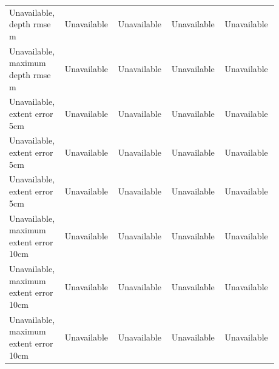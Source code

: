 \begin{longtable}{p{0.1760\linewidth}p{0.1760\linewidth}p{0.1760\linewidth}p{0.1760\linewidth}p{0.1760\linewidth}}
Unavailable, depth rmse m & Unavailable & Unavailable & Unavailable & Unavailable \\
Unavailable, maximum depth rmse m & Unavailable & Unavailable & Unavailable & Unavailable \\
Unavailable, extent error 5cm & Unavailable & Unavailable & Unavailable & Unavailable \\
Unavailable, extent error 5cm & Unavailable & Unavailable & Unavailable & Unavailable \\
Unavailable, extent error 5cm & Unavailable & Unavailable & Unavailable & Unavailable \\
Unavailable, maximum extent error 10cm & Unavailable & Unavailable & Unavailable & Unavailable \\
Unavailable, maximum extent error 10cm & Unavailable & Unavailable & Unavailable & Unavailable \\
Unavailable, maximum extent error 10cm & Unavailable & Unavailable & Unavailable & Unavailable \\
\end{longtable}
